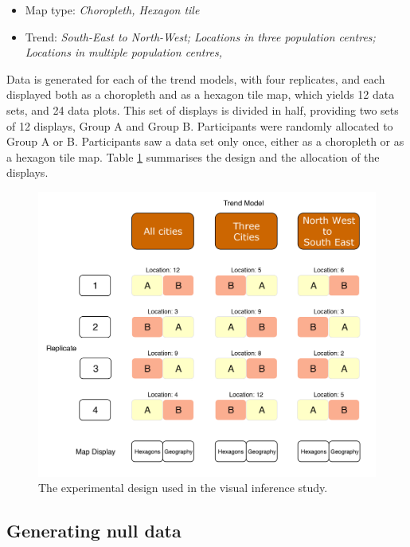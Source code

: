 \documentclass{monashthesis}
\begin{document}
\begin{itemize}
\tightlist
\item
  Map type: \emph{Choropleth, Hexagon tile}
\item
  Trend: \emph{South-East to North-West; Locations in three population centres; Locations in multiple population centres, }
\end{itemize}

Data is generated for each of the trend models, with four replicates, and each displayed both as a choropleth and as a hexagon tile map, which yields 12 data sets, and 24 data plots. This set of displays is divided in half, providing two sets of 12 displays, Group A and Group B. Participants were randomly allocated to Group A or B. Participants saw a data set only once, either as a choropleth or as a hexagon tile map. Table \ref{fig:exp-design} summarises the design and the allocation of the displays.

\begin{figure}[H]
\centering
\includegraphics[width=16cm]{figures/04-experiment/experiment_design.pdf}
\caption{\label{fig:exp-design}The experimental design used in the visual inference study.}
\end{figure}

\hypertarget{generating-null-data}{%
\subsection{Generating null data}\label{generating-null-data}}
\end{document}
